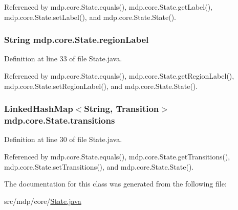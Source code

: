 Referenced by mdp.\+core.\+State.\+equals(), mdp.\+core.\+State.\+get\+Label(), mdp.\+core.\+State.\+set\+Label(), and mdp.\+core.\+State.\+State().

\hypertarget{classmdp_1_1core_1_1_state_aa6f24dca5cb78d028e99f69b9e6ccb2c}{}
\subsubsection[{region\+Label}]{\setlength{\rightskip}{0pt plus 5cm}String mdp.\+core.\+State.\+region\+Label\hspace{0.3cm}{\ttfamily [private]}}\label{classmdp_1_1core_1_1_state_aa6f24dca5cb78d028e99f69b9e6ccb2c}


Definition at line 33 of file State.\+java.



Referenced by mdp.\+core.\+State.\+equals(), mdp.\+core.\+State.\+get\+Region\+Label(), mdp.\+core.\+State.\+set\+Region\+Label(), and mdp.\+core.\+State.\+State().

\hypertarget{classmdp_1_1core_1_1_state_a3c9b563199f7e235fe083b0d16da8cf3}{}
\subsubsection[{transitions}]{\setlength{\rightskip}{0pt plus 5cm}Linked\+Hash\+Map$<$String, {\bf Transition}$>$ mdp.\+core.\+State.\+transitions\hspace{0.3cm}{\ttfamily [private]}}\label{classmdp_1_1core_1_1_state_a3c9b563199f7e235fe083b0d16da8cf3}


Definition at line 30 of file State.\+java.



Referenced by mdp.\+core.\+State.\+equals(), mdp.\+core.\+State.\+get\+Transitions(), mdp.\+core.\+State.\+set\+Transitions(), and mdp.\+core.\+State.\+State().



The documentation for this class was generated from the following file\+:\begin{DoxyCompactItemize}
\item 
src/mdp/core/\hyperlink{_state_8java}{State.\+java}\end{DoxyCompactItemize}
